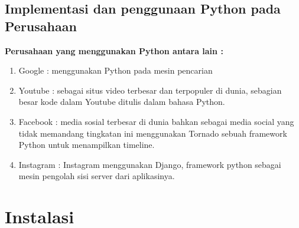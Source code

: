 \documentclass[a4paper,12pt]{report}
\begin{document}
\section{Implementasi dan penggunaan Python pada Perusahaan}
\usepackage{Pengggunaan Python sebagai Data Science dan Data Mechine Learning sangat berpengaruh dalam perkembangan tiap lini yang ada baik pada kesehatan, pendidikan bahkan pada kebutuhan sebuah perusahaan terutama bidang IT.}
\textbf{Perusahaan yang menggunakan Python antara lain :}
\begin{enumerate}
    \item Google : menggunakan Python pada mesin pencarian
    \item Youtube : sebagai situs video terbesar dan terpopuler di dunia, sebagian besar kode dalam Youtube ditulis dalam bahasa Python.
    \item Facebook : media sosial terbesar di dunia bahkan sebagai media social yang tidak memandang tingkatan ini menggunakan Tornado sebuah framework Python untuk menampilkan timeline.
    \item Instagram : Instagram menggunakan Django, framework python sebagai mesin pengolah sisi server dari aplikasinya.

\end{enumerate}
   
\chapter{Instalasi}
\end{document}
